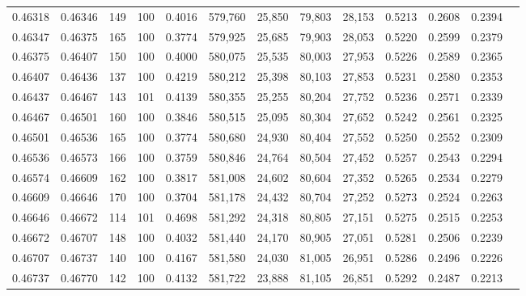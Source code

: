 \begin{tabular}{rrrrrrrrrrrrr}
0.46318 & 0.46346 &    149 & 100 &                                     0.4016 & 579,760 &  25,850 &  79,803 &  28,153 & 0.5213 & 0.2608 & 0.2394 \\
0.46347 & 0.46375 &    165 & 100 &                                     0.3774 & 579,925 &  25,685 &  79,903 &  28,053 & 0.5220 & 0.2599 & 0.2379 \\
0.46375 & 0.46407 &    150 & 100 &                                     0.4000 & 580,075 &  25,535 &  80,003 &  27,953 & 0.5226 & 0.2589 & 0.2365 \\
0.46407 & 0.46436 &    137 & 100 &                                     0.4219 & 580,212 &  25,398 &  80,103 &  27,853 & 0.5231 & 0.2580 & 0.2353 \\
0.46437 & 0.46467 &    143 & 101 &                                     0.4139 & 580,355 &  25,255 &  80,204 &  27,752 & 0.5236 & 0.2571 & 0.2339 \\
0.46467 & 0.46501 &    160 & 100 &                                     0.3846 & 580,515 &  25,095 &  80,304 &  27,652 & 0.5242 & 0.2561 & 0.2325 \\
0.46501 & 0.46536 &    165 & 100 &                                     0.3774 & 580,680 &  24,930 &  80,404 &  27,552 & 0.5250 & 0.2552 & 0.2309 \\
0.46536 & 0.46573 &    166 & 100 &                                     0.3759 & 580,846 &  24,764 &  80,504 &  27,452 & 0.5257 & 0.2543 & 0.2294 \\
0.46574 & 0.46609 &    162 & 100 &                                     0.3817 & 581,008 &  24,602 &  80,604 &  27,352 & 0.5265 & 0.2534 & 0.2279 \\
0.46609 & 0.46646 &    170 & 100 &                                     0.3704 & 581,178 &  24,432 &  80,704 &  27,252 & 0.5273 & 0.2524 & 0.2263 \\
0.46646 & 0.46672 &    114 & 101 &                                     0.4698 & 581,292 &  24,318 &  80,805 &  27,151 & 0.5275 & 0.2515 & 0.2253 \\
0.46672 & 0.46707 &    148 & 100 &                                     0.4032 & 581,440 &  24,170 &  80,905 &  27,051 & 0.5281 & 0.2506 & 0.2239 \\
0.46707 & 0.46737 &    140 & 100 &                                     0.4167 & 581,580 &  24,030 &  81,005 &  26,951 & 0.5286 & 0.2496 & 0.2226 \\
0.46737 & 0.46770 &    142 & 100 &                                     0.4132 & 581,722 &  23,888 &  81,105 &  26,851 & 0.5292 & 0.2487 & 0.2213 \\

\end{tabular}
